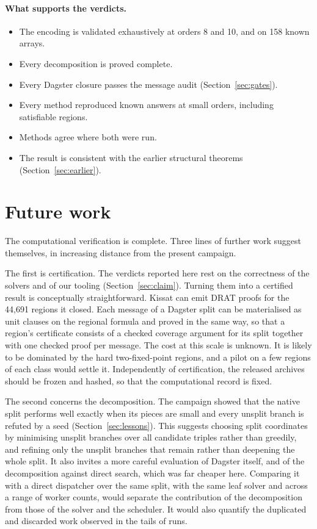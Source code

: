 \documentclass[11pt,a4paper]{article}
\theoremstyle{definition}
\begin{document}
\paragraph{What supports the verdicts.}
\begin{itemize}
\item The encoding is validated exhaustively at orders 8 and 10, and on 158 known arrays.
\item Every decomposition is proved complete.
\item Every Dagster closure passes the message audit (Section~\ref{sec:gates}).
\item Every method reproduced known answers at small orders, including satisfiable regions.
\item Methods agree where both were run.
\item The result is consistent with the earlier structural theorems (Section~\ref{sec:earlier}).
\end{itemize}

\section{Future work}\label{sec:further}

The computational verification is complete. Three lines of further work suggest themselves, in
increasing distance from the present campaign.

The first is certification. The verdicts reported here rest on the correctness of the solvers and
of our tooling (Section~\ref{sec:claim}). Turning them into a certified result is conceptually
straightforward. Kissat can emit DRAT proofs for the 44{,}691 regions it closed. Each message of a
Dagster split can be materialised as unit clauses on the regional formula and proved in the same
way, so that a region's certificate consists of a checked coverage argument for its split together
with one checked proof per message. The cost at this scale is unknown. It is likely to be
dominated by the hard two-fixed-point regions, and a pilot on a few regions of each class would
settle it. Independently of certification, the released archives should be frozen and hashed, so
that the computational record is fixed.

The second concerns the decomposition. The campaign showed that the native split performs well
exactly when its pieces are small and every unsplit branch is refuted by a seed
(Section~\ref{sec:lessons}). This suggests choosing split coordinates by minimising unsplit
branches over all candidate triples rather than greedily, and refining only the unsplit branches
that remain rather than deepening the whole split. It also invites a more careful evaluation of
Dagster itself, and of the decomposition against direct search, which was far cheaper here. Comparing it with a direct dispatcher over the same split, with the same leaf
solver and across a range of worker counts, would separate the contribution of the decomposition
from those of the solver and the scheduler. It would also quantify the duplicated and discarded
work observed in the tails of runs.
\end{document}
